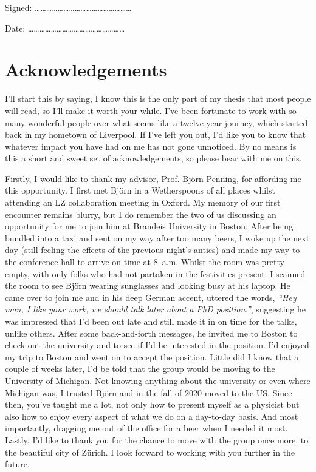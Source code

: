 \documentclass[a4paper,11pt,usegeometry]{scrreprt} %
\begin{document}
Signed:
……………………………………………
\bigskip

Date:
……………………………………………

\newpage\null\thispagestyle{empty}\newpage
\chapter*{Acknowledgements}
I'll start this by saying, I know this is the only part of my thesis that most people will read, so I'll make it worth your while. I've been fortunate to work with so many wonderful people over what seems like a twelve-year journey, which started back in my hometown of Liverpool. If I've left you out, I'd like you to know that whatever impact you have had on me has not gone unnoticed. By no means is this a short and sweet set of acknowledgements, so please bear with me on this.

Firstly, I would like to thank my advisor, Prof. Bj\"orn Penning, for affording me this opportunity. I first met Bj\"orn in a Wetherspoons of all places whilst attending an LZ collaboration meeting in Oxford. My memory of our first encounter remains blurry, but I do remember the two of us discussing an opportunity for me to join him at Brandeis University in Boston. After being bundled into a taxi and sent on my way after too many beers, I woke up the next day (still feeling the effects of the previous night's antics) and made my way to the conference hall to arrive on time at 8~a.m. Whilst the room was pretty empty, with only folks who had not partaken in the festivities present. I scanned the room to see Bj\"orn wearing sunglasses and looking busy at his laptop. He came over to join me and in his deep German accent, uttered the words, \textit{``Hey man, I like your work, we should talk later about a PhD position.''}, suggesting he was impressed that I’d been out late and still made it in on time for the talks, unlike others. After some back-and-forth messages, he invited me to Boston to check out the university and to see if I'd be interested in the position. I'd enjoyed my trip to Boston and went on to accept the position. Little did I know that a couple of weeks later, I'd be told that the group would be moving to the University of Michigan. Not knowing anything about the university or even where Michigan was, I trusted Bj\"orn and in the fall of 2020 moved to the US. Since then, you've taught me a lot, not only how to present myself as a physicist but also how to enjoy every aspect of what we do on a day-to-day basis. And most importantly, dragging me out of the office for a beer when I needed it most. Lastly, I'd like to thank you for the chance to move with the group once more, to the beautiful city of Z\"urich. I look forward to working with you further in the future.
\end{document}
